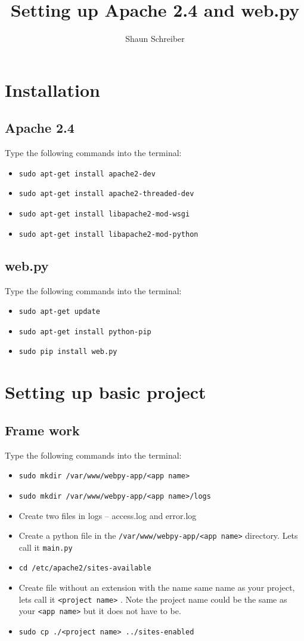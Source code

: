 \documentclass{article}
\author{Shaun Schreiber}
\title{Setting up Apache 2.4 and web.py}
\date{}
\begin{document}
\maketitle

\section{Installation}
\subsection{Apache 2.4}
Type the following commands into the terminal:
\begin{itemize}
\item \verb#sudo apt-get install apache2-dev#
\item \verb#sudo apt-get install apache2-threaded-dev#
\item \verb#sudo apt-get install libapache2-mod-wsgi#
\item \verb#sudo apt-get install libapache2-mod-python#
\end{itemize}
\subsection{web.py}
Type the following commands into the terminal:
\begin{itemize}
\item \verb#sudo apt-get update#
\item \verb#sudo apt-get install python-pip#
\item \verb#sudo pip install web.py#
\end{itemize}

\section{Setting up basic project}
\subsection{Frame work}
Type the following commands into the terminal:
\begin{itemize}
\item \verb#sudo mkdir /var/www/webpy-app/<app name>#
\item \verb#sudo mkdir /var/www/webpy-app/<app name>/logs#
\item Create two files in logs -- access.log and error.log
\item Create a python file in the \verb#/var/www/webpy-app/<app name># directory. Lets call it \verb#main.py#
\item \verb#cd /etc/apache2/sites-available#
\item Create file without an extension with the name same name as your project, lets call it \verb#<project name># . Note the project name could be the same as your \verb#<app name># but it does not have to be.
\item \verb#sudo cp ./<project name> ../sites-enabled#
\end{itemize}
\end{document}
